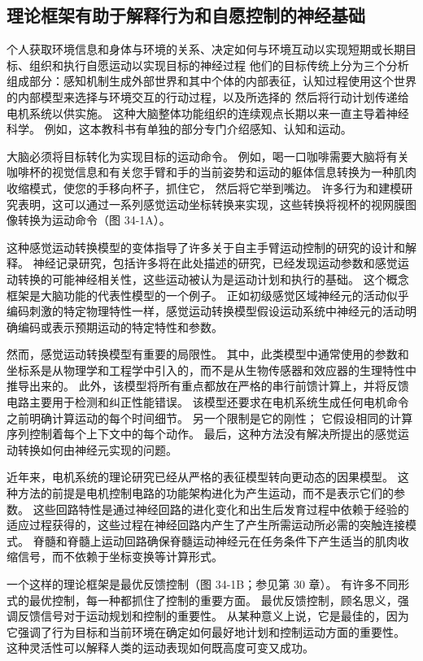\subsection{理论框架有助于解释行为和自愿控制的神经基础}
个人获取环境信息和身体与环境的关系、决定如何与环境互动以实现短期或长期目标、组织和执行自愿运动以实现目标的神经过程 他们的目标传统上分为三个分析组成部分：感知机制生成外部世界和其中个体的内部表征，认知过程使用这个世界的内部模型来选择与环境交互的行动过程，以及所选择的 然后将行动计划传递给电机系统以供实施。 这种大脑整体功能组织的连续观点长期以来一直主导着神经科学。 例如，这本教科书有单独的部分专门介绍感知、认知和运动。

大脑必须将目标转化为实现目标的运动命令。 例如，喝一口咖啡需要大脑将有关咖啡杯的视觉信息和有关您手臂和手的当前姿势和运动的躯体信息转换为一种肌肉收缩模式，使您的手移向杯子，抓住它， 然后将它举到嘴边。 许多行为和建模研究表明，这可以通过一系列感觉运动坐标转换来实现，这些转换将视杯的视网膜图像转换为运动命令（图 34-1A）。

这种感觉运动转换模型的变体指导了许多关于自主手臂运动控制的研究的设计和解释。 神经记录研究，包括许多将在此处描述的研究，已经发现运动参数和感觉运动转换的可能神经相关性，这些运动被认为是运动计划和执行的基础。 这个概念框架是大脑功能的代表性模型的一个例子。 正如初级感觉区域神经元的活动似乎编码刺激的特定物理特性一样，感觉运动转换模型假设运动系统中神经元的活动明确编码或表示预期运动的特定特性和参数。

然而，感觉运动转换模型有重要的局限性。 其中，此类模型中通常使用的参数和坐标系是从物理学和工程学中引入的，而不是从生物传感器和效应器的生理特性中推导出来的。 此外，该模型将所有重点都放在严格的串行前馈计算上，并将反馈电路主要用于检测和纠正性能错误。 该模型还要求在电机系统生成任何电机命令之前明确计算运动的每个时间细节。 另一个限制是它的刚性； 它假设相同的计算序列控制着每个上下文中的每个动作。 最后，这种方法没有解决所提出的感觉运动转换如何由神经元实现的问题。

近年来，电机系统的理论研究已经从严格的表征模型转向更动态的因果模型。 这种方法的前提是电机控制电路的功能架构进化为产生运动，而不是表示它们的参数。 这些回路特性是通过神经回路的进化变化和出生后发育过程中依赖于经验的适应过程获得的，这些过程在神经回路内产生了产生所需运动所必需的突触连接模式。 脊髓和脊髓上运动回路确保脊髓运动神经元在任务条件下产生适当的肌肉收缩信号，而不依赖于坐标变换等计算形式。

一个这样的理论框架是最优反馈控制（图 34-1B；参见第 30 章）。 有许多不同形式的最优控制，每一种都抓住了控制的重要方面。 最优反馈控制，顾名思义，强调反馈信号对于运动规划和控制的重要性。 从某种意义上说，它是最佳的，因为它强调了行为目标和当前环境在确定如何最好地计划和控制运动方面的重要性。 这种灵活性可以解释人类的运动表现如何既高度可变又成功。

